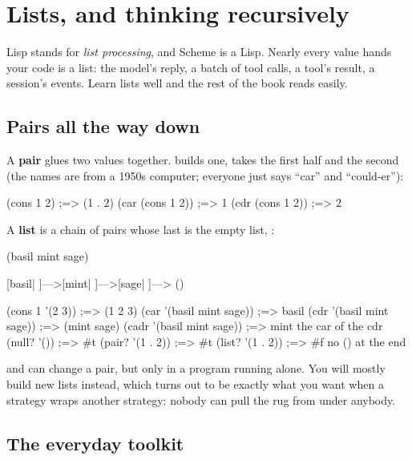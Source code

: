 \chapter{Lists, and thinking recursively}
\label{ch:lists}

Lisp stands for \emph{list processing}, and Scheme is a Lisp. Nearly every
value \nodwyn{} hands your code is a list: the model's reply, a batch of tool
calls, a tool's result, a session's events. Learn lists well and the rest of
the book reads easily.

\section{Pairs all the way down}

A \textbf{pair} glues two values together.  builds one,
 takes the first half and  the second (the names are
from a 1950s computer; everyone just says ``car'' and ``could-er''):

\begin{scm}
(cons 1 2)                  ;=> (1 . 2)
(car (cons 1 2))            ;=> 1
(cdr (cons 1 2))            ;=> 2
\end{scm}

A \textbf{list} is a chain of pairs whose last  is the empty
list, :

\begin{txt}
   (basil mint sage)

   [basil| ]--->[mint| ]--->[sage| ]---> ()
\end{txt}

\begin{scm}
(cons 1 '(2 3))             ;=> (1 2 3)
(car '(basil mint sage))    ;=> basil
(cdr '(basil mint sage))    ;=> (mint sage)
(cadr '(basil mint sage))   ;=> mint        the car of the cdr
(null? '())                 ;=> #t
(pair? '(1 . 2))            ;=> #t
(list? '(1 . 2))            ;=> #f          no () at the end
\end{scm}

 and  can change a pair, but only in a
program running alone. You will mostly build new lists instead, which turns
out to be exactly what you want when a strategy wraps another strategy:
nobody can pull the rug from under anybody.

\section{The everyday toolkit}

